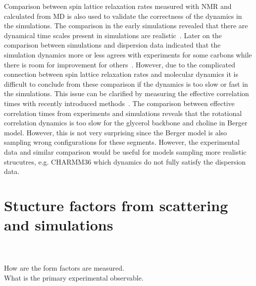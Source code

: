 \documentclass[aps,prl,superscriptaddress,twocolumn]{revtex4}
\begin{document}
Comparison between spin lattice relaxation rates measured with NMR and calculated from MD
is also used to validate the correctness of the dynamics in the simulations.
The comparison in the early simulations revealed that there are dynamical
time scales present in simulations are realistic~\cite{??}. Later on the 
comparison between simulations and dispersion data indicated that the
simulation dynamics more or less agrees with experiments for some carbons
while there is room for improvement for others~\cite{??}. However, due to
the complicated connection between spin lattice relaxation rates and molecular dynamics
it is difficult to conclude from these comparison if the dynamics is too slow or
fast in the simulations. This issue can be clarified by measuring the effective correlation
times with recently introduced methods~\cite{ferrerira15}. The comparison between 
effective correlation times from experiments and simulations reveals that
the rotational correlation dynamics is too slow for the glycerol backbone and choline 
in Berger model. However, this is not very surprising since the Berger model is also sampling wrong configurations for
these segments. However, the experimental data and similar comparison would be useful
for models sampling more realistic strucutres, e.g. CHARMM36 which dynamics do not fully
satisfy the dispersion data.





\section{Stucture factors from scattering and simulations}

 \\[0.1cm]

\\[0.1cm]

\noindent How are the form factors are measured.\\
What is the primary experimental observable. \\

  \\

\end{document}
